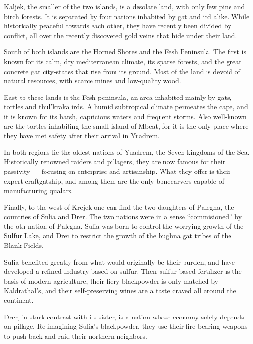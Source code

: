 Kaljek, the smaller of the two islands, is a desolate land, with only few pine and birch forests.
It is separated by four nations inhabited by gat and ird alike.
While historically peaceful towards each other, they have recently been divided by conflict, all over the recently discovered gold veins that hide under their land.

South of both islands are the Horned Shores and the Fesh Peninsula.
The first is known for its calm, dry mediterranean climate, its sparse forests, and the great concrete gat city-states that rise from its ground.
Most of the land is devoid of natural resources, with scarce mines and low-quality wood.

East to these lands is the Fesh peninsula, an area inhabited mainly by gats, tortles and thul'kraka irds.
A humid subtropical climate permeates the cape, and it is known for its harsh, capricious waters and frequent storms.
Also well-known are the tortles inhabiting the small island of Mbeat, for it is the only place where they have met safety after their arrival in Yuadrem.

In both regions lie the oldest nations of Yuadrem, the Seven kingdoms of the Sea.
Historically renowned raiders and pillagers, they are now famous for their passivity --- focusing on enterprise and artisanship.
What they offer is their expert craftgatship, and among them are the only bonecarvers capable of manufacturing qualars.

Finally, to the west of Krejek one can find the two daughters of Palegna, the countries of Sulia and Drer.
The two nations were in a sense ``commisioned'' by the oth nation of Palegna.
Sulia was born to control the worrying growth of the Sulfur Lake, and Drer to restrict the growth of the bughna gat tribes of the Blank Fields.

Sulia benefited greatly from what would originally be their burden, and have developed a refined industry based on sulfur.
Their sulfur-based fertilizer is the basis of modern agriculture, their fiery blackpowder is only matched by Kaldrathal's, and their self-preserving wines are a taste craved all around the continent.

Drer, in stark contrast with its sister, is a nation whose economy solely depends on pillage.
Re-imagining Sulia's blackpowder, they use their fire-bearing weapons to push back and raid their northern neighbors.
